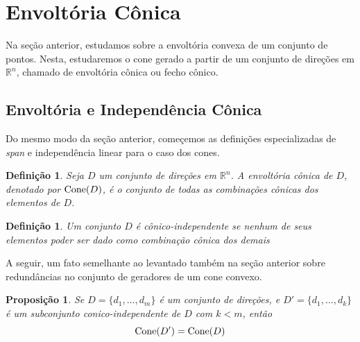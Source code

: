 \newtheorem{def:envoltoria conica}[def:conjunto convexo]{Definição}
\newtheorem{def:independencia conica}[def:conjunto convexo]{Definição}

\newtheorem{prop:redundancia conica}[prop:combinação convexa]{Proposição}

\newtheorem{thm:caratheodory cones}[thm:caratheodory]{Teorema}

\newtheorem{cor:caratheodory cones}[cor:caratheodory]{Corolário}

\section{Envoltória Cônica}

Na seção anterior, estudamos sobre a envoltória convexa de um conjunto de
pontos. Nesta, estudaremos o cone gerado a partir de um conjunto de direções
em $\mathbb{R}^n$, chamado de envoltória cônica ou fecho cônico.

\subsection{Envoltória e Independência Cônica}

Do mesmo modo da seção anterior, começemos as definições especializadas
de \textit{span} e independência linear para o caso dos cones.

\begin{def:envoltoria conica}
  Seja $D$ um conjunto de direções em $\mathbb{R}^n$. A envoltória cônica de
  $D$, denotado por $\mathrm{Cone}(D)$, é o conjunto de todas as combinações cônicas
  dos elementos de $D$.
\end{def:envoltoria conica}

\begin{def:independencia conica}
 Um conjunto $D$ é cônico-independente se nenhum de seus elementos poder ser
 dado como combinação cônica dos demais
\end{def:independencia conica}

A seguir, um fato semelhante ao levantado também na seção anterior sobre
redundâncias no conjunto de geradores de um cone convexo.
\begin{prop:redundancia conica}
  Se $D = \{d_1, \dots, d_m\}$ é um conjunto de direções, e
  $D' = \{d_1, \dots, d_k\}$ é um subconjunto conico-independente
  de $D$ com $k < m$, então
  \[
    \mathrm{Cone}(D') = \mathrm{Cone}(D)
  \]
\end{prop:redundancia conica}

